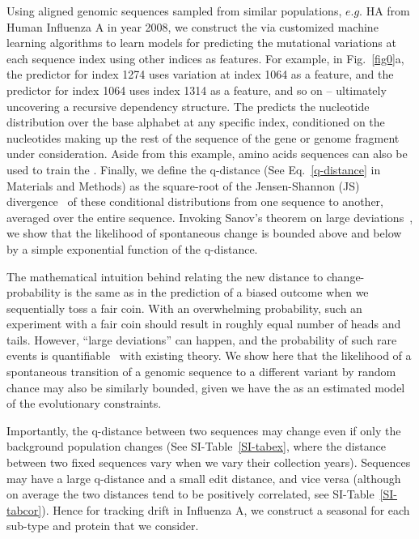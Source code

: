 \documentclass[onecolumn, compsoc,10pt]{IEEEtran}
\begin{document}
Using aligned genomic sequences sampled from  similar populations, $e.g.$ HA from Human Influenza A in year 2008, we construct the \qnet via  customized machine learning algorithms to  learn models for predicting the mutational variations at each sequence index using other indices  as features. For example, in Fig.~\ref{fig0}a,  the predictor for index 1274 uses variation at index 1064 as a feature, and the predictor for index 1064 uses index 1314 as a feature, and so on -- ultimately uncovering a recursive dependency structure. The \qnet predicts the nucleotide distribution over the base alphabet at any specific index, conditioned on the nucleotides making up the rest of the sequence of the gene or genome fragment under consideration. Aside from this example, amino acids sequences can also be used to train the \qnet. Finally, we define the q-distance (See Eq.~\eqref{q-distance} in Materials and Methods) as the square-root of the Jensen-Shannon (JS) divergence~\cite{cover} of these conditional distributions from one sequence to another, averaged over the entire sequence. Invoking Sanov's theorem on large deviations~\cite{cover}, we show  that the  likelihood of spontaneous change is bounded above and below by a simple exponential function of the  q-distance. 

The mathematical intuition behind relating the new distance to change-probability  is the same as in the prediction of  a biased outcome when we sequentially toss a fair coin. With an overwhelming probability, such an experiment with a fair coin should result in roughly equal number of heads and tails. However, ``large deviations'' can happen, and the probability of such rare events is quantifiable~\cite{varadhan2010large} with existing theory. We show here that the likelihood of a spontaneous transition of a genomic sequence to a  different variant by random chance may also be similarly bounded, given we have the \qnet as  an estimated model of the evolutionary constraints.

Importantly, the q-distance  between two sequences may change even if only the background population changes (See SI-Table~\ref{SI-tabex}, where  the distance between two  fixed sequences vary when we vary their collection years). Sequences may have a large q-distance and a small edit distance, and vice versa (although on average the two distances tend to be positively correlated, see SI-Table~\ref{SI-tabcor}).  Hence for tracking drift in Influenza A, we construct a seasonal \qnet for each sub-type and protein that we consider.
\end{document}
